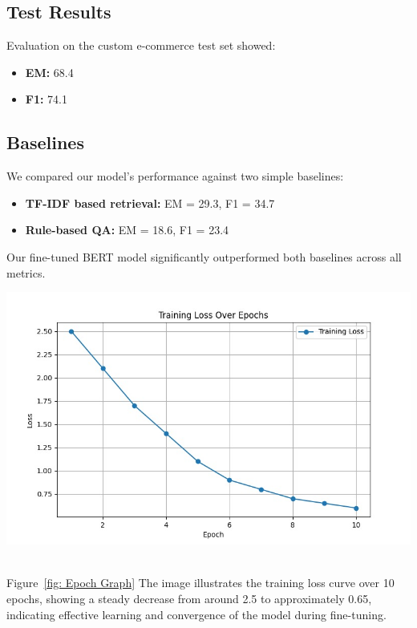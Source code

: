 \documentclass[10pt,conference]{IEEEtran}
\begin{document}
\subsection{Test Results}
Evaluation on the custom e-commerce test set showed:
\begin{itemize}
    \item \textbf{EM:} 68.4
    \item \textbf{F1:} 74.1
\end{itemize}

\subsection{Baselines}
We compared our model's performance against two simple baselines:
\begin{itemize}
    \item \textbf{TF-IDF based retrieval:} EM = 29.3, F1 = 34.7
    \item \textbf{Rule-based QA:} EM = 18.6, F1 = 23.4
\end{itemize}
Our fine-tuned BERT model significantly outperformed both baselines across all metrics. \\

\begin{minipage}[t]{0.55\textwidth}   %
  \centering
  \includegraphics[width=\linewidth]{fig3.jpg}
  \label{fig: Epoch Graph}
\end{minipage} \\

Figure~\ref{fig: Epoch Graph} The image illustrates the training loss curve over 10 epochs, showing a steady decrease from around 2.5 to approximately 0.65, indicating effective learning and convergence of the model during fine-tuning.
\end{document}
